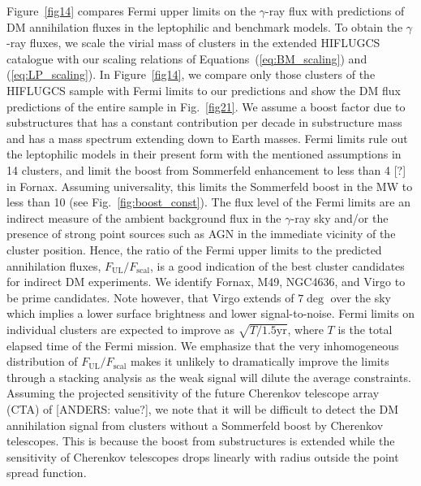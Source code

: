 \documentclass[10pt,aps,pra,reprint,amsmath,amsfonts,amssymb,showpacs]{revtex4-1}
\begin{document}
Figure~\ref{fig14} compares Fermi upper limits on the $\gamma$-ray flux with
predictions of DM annihilation fluxes in the leptophilic and benchmark models.
To obtain the $\gamma$-ray fluxes, we scale the virial mass of clusters in the
extended HIFLUGCS catalogue \cite{2002ApJ...567..716R} with our scaling
relations of Equations~(\ref{eq:BM_scaling}) and (\ref{eq:LP_scaling}). In
Figure~\ref{fig14}, we compare only those clusters of the HIFLUGCS sample with
Fermi limits to our predictions and show the DM flux predictions of the entire
sample in Fig.~\ref{fig21}.  We assume a boost factor due to substructures that
has a constant contribution per decade in substructure mass and has a mass
spectrum extending down to Earth masses. Fermi limits rule out the leptophilic
models in their present form with the mentioned assumptions in 14 clusters, and
limit the boost from Sommerfeld enhancement to less than 4 [?] in
Fornax. Assuming universality, this limits the Sommerfeld boost in the MW to
less than 10 (see Fig.~\ref{fig:boost_const}).  The flux level of the Fermi
limits are an indirect measure of the ambient background flux in the
$\gamma$-ray sky and/or the presence of strong point sources such as AGN in the
immediate vicinity of the cluster position. Hence, the ratio of the Fermi upper
limits to the predicted annihilation fluxes,
$F_{\mathrm{UL}}/F_{\mathrm{scal}}$, is a good indication of the best cluster
candidates for indirect DM experiments. We identify Fornax, M49, NGC4636, and
Virgo to be prime candidates. Note however, that Virgo extends of $7\deg$ over
the sky which implies a lower surface brightness and lower signal-to-noise.
Fermi limits on individual clusters are expected to improve as $\sqrt{T/1.5
  \mathrm{yr}}$, where $T$ is the total elapsed time of the Fermi mission. We
emphasize that the very inhomogeneous distribution of $F_{\mathrm{UL}}/
F_{\mathrm{scal}}$ makes it unlikely to dramatically improve the limits through
a stacking analysis as the weak signal will dilute the average constraints.
Assuming the projected sensitivity of the future Cherenkov telescope array (CTA)
of [ANDERS: value?], we note that it will be difficult to detect the DM
annihilation signal from clusters without a Sommerfeld boost by Cherenkov
telescopes. This is because the boost from substructures is extended while the
sensitivity of Cherenkov telescopes drops linearly with radius outside the point
spread function.
\end{document}
